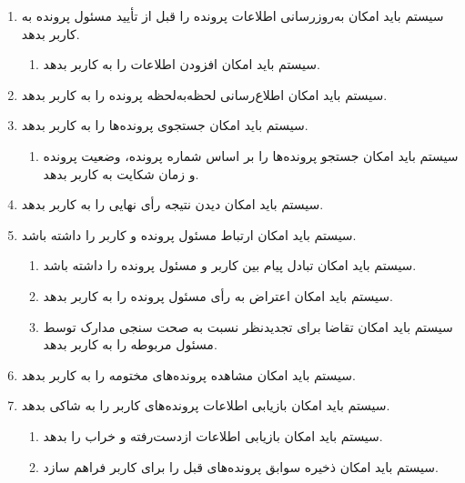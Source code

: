 \documentclass[12pt,a4paper,oneside]{article}
\begin{document}
\begin{itemize}
\begin{enumerate}
        \item 
        سیستم باید امکان به‌روزرسانی اطلاعات پرونده را قبل از تأیید مسئول پرونده به کاربر بدهد.
        \begin{enumerate}
            \renewcommand{\labelenumii}{\textbf{.R\arabic{enumi}.\arabic{enumii}}}
            \item 
            سیستم باید امکان افزودن اطلاعات را به کاربر بدهد.
        \end{enumerate}

        \item 
        سیستم باید امکان اطلاع‌رسانی لحظه‌به‌لحظه پرونده را به کاربر بدهد.

        \item 
        سیستم باید امکان جستجوی پرونده‌ها را به کاربر بدهد.
        \begin{enumerate}
            \renewcommand{\labelenumii}{\textbf{.R\arabic{enumi}.\arabic{enumii}}}
            \item 
            سیستم باید امکان جستجو پرونده‌ها را بر اساس شماره پرونده، وضعیت پرونده و زمان شکایت به کاربر بدهد.
        \end{enumerate}

        \item 
        سیستم باید امکان دیدن نتیجه رأی نهایی را به کاربر بدهد.

        \item 
        سیستم باید امکان ارتباط مسئول پرونده و کاربر را داشته باشد.
        \begin{enumerate}
            \renewcommand{\labelenumii}{\textbf{.R\arabic{enumi}.\arabic{enumii}}}
            \item 
            سیستم باید امکان تبادل پیام بین کاربر و مسئول پرونده را داشته باشد.
            \item 
            سیستم باید امکان اعتراض به رأی مسئول پرونده را به کاربر بدهد.
            \item 
            سیستم باید امکان تقاضا برای تجدیدنظر نسبت به صحت سنجی مدارک توسط مسئول مربوطه را به کاربر بدهد.
        \end{enumerate}

        \item 
        سیستم باید امکان مشاهده پرونده‌های مختومه را به کاربر بدهد.

        \item 
        سیستم باید امکان بازیابی اطلاعات پرونده‌های کاربر را به شاکی بدهد.
        \begin{enumerate}
            \renewcommand{\labelenumii}{\textbf{.R\arabic{enumi}.\arabic{enumii}}}
            \item 
            سیستم باید امکان بازیابی اطلاعات ازدست‌رفته و خراب را بدهد.
            \item 
            سیستم باید امکان ذخیره سوابق پرونده‌های قبل را برای کاربر فراهم سازد.
        \end{enumerate}


\end{enumerate}
\end{itemize}
\end{document}
